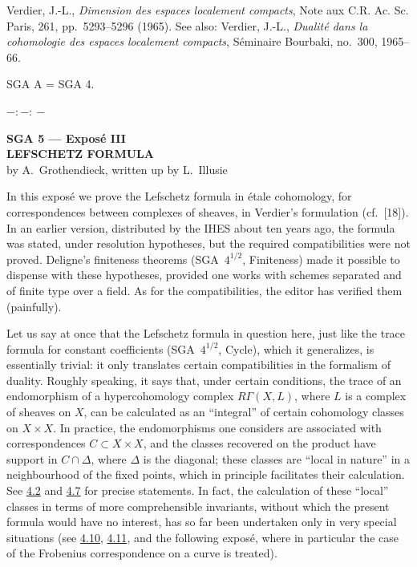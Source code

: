 \documentclass[11pt]{article}
\begin{document}
\begin{enumerate}[label={[\arabic*]}]
\item Verdier, J.-L., \emph{Dimension des espaces localement compacts}, Note aux C.R. Ac. Sc. Paris, 261, pp.~5293--5296 (1965). See also: Verdier, J.-L., \emph{Dualité dans la cohomologie des espaces localement compacts}, Séminaire Bourbaki, no.~300, 1965--66.
\end{enumerate}

SGA A = SGA 4.

\begin{center}
$-:\!-:\!-$
\end{center}

\clearpage
\begin{center}
\label{sga5:III:expose:iii}{\Large \textbf{SGA 5 --- Exposé III}}\\[0.4em]
{\large \textbf{LEFSCHETZ FORMULA}}\\[0.3em]
by A.~Grothendieck, written up by L.~Illusie
\end{center}

In this exposé we prove the Lefschetz formula in étale cohomology, for correspondences between complexes of sheaves, in Verdier's formulation (cf.~[18]). In an earlier version, distributed by the IHES about ten years ago, the formula was stated, under resolution hypotheses, but the required compatibilities were not proved. Deligne's finiteness theorems (SGA~$4^{1/2}$, Finiteness) made it possible to dispense with these hypotheses, provided one works with schemes separated and of finite type over a field. As for the compatibilities, the editor has verified them (painfully).

Let us say at once that the Lefschetz formula in question here, just like the trace formula for constant coefficients (SGA~$4^{1/2}$, Cycle), which it generalizes, is essentially trivial: it only translates certain compatibilities in the formalism of duality. Roughly speaking, it says that, under certain conditions, the trace of an endomorphism of a hypercohomology complex $R\Gamma(X,L)$, where $L$ is a complex of sheaves on $X$, can be calculated as an ``integral'' of certain cohomology classes on $X\times X$. In practice, the endomorphisms one considers are associated with correspondences $C\subset X\times X$, and the classes recovered on the product have support in $C\cap\Delta$, where $\Delta$ is the diagonal; these classes are ``local in nature'' in a neighbourhood of the fixed points, which in principle facilitates their calculation. See \hyperref[sga5:III:subsection:4.2]{4.2} and \hyperref[sga5:III:corollary:4.7]{4.7} for precise statements. In fact, the calculation of these ``local'' classes in terms of more comprehensible invariants, without which the present formula would have no interest, has so far been undertaken only in very special situations (see \hyperref[sga5:III:corollary:4.10]{4.10}, \hyperref[sga5:III:statement:4.11]{4.11}, and the following exposé, where in particular the case of the Frobenius correspondence on a curve is treated).
\end{document}
